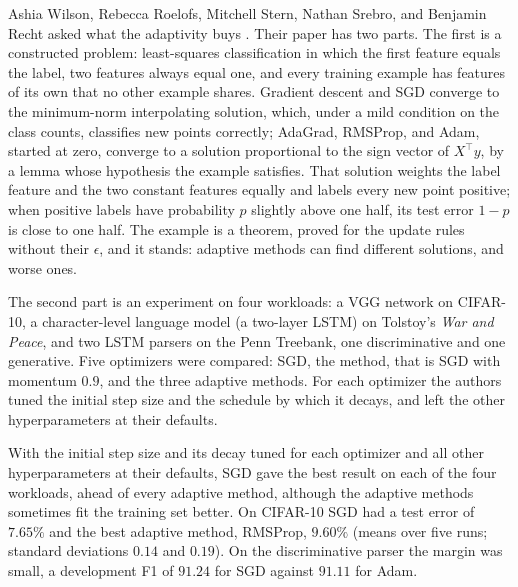 \begin{refsection}
Ashia Wilson, Rebecca Roelofs, Mitchell Stern, Nathan Srebro, and Benjamin Recht asked what the adaptivity buys \parencite{WilsonEtAl2017}. Their paper has two parts. The first is a constructed problem: least-squares classification in which the first feature equals the label, two features always equal one, and every training example has features of its own that no other example shares. Gradient descent and SGD converge to the minimum-norm interpolating solution, which, under a mild condition on the class counts, classifies new points correctly; AdaGrad, RMSProp, and Adam, started at zero, converge to a solution proportional to the sign vector of $X^\top y$, by a lemma whose hypothesis the example satisfies. That solution weights the label feature and the two constant features equally and labels every new point positive; when positive labels have probability $p$ slightly above one half, its test error $1-p$ is close to one half. The example is a theorem, proved for the update rules without their $\epsilon$, and it stands: adaptive methods can find different solutions, and worse ones.

The second part is an experiment on four workloads: a VGG network on CIFAR-10, a character-level language model (a two-layer LSTM) on Tolstoy's \emph{War and Peace}, and two LSTM parsers on the Penn Treebank, one discriminative and one generative. Five optimizers were compared: SGD, the  method, that is SGD with momentum $0.9$, and the three adaptive methods. For each optimizer the authors tuned the initial step size and the schedule by which it decays, and left the other hyperparameters at their defaults.

\begin{finding}\label{fd:budgets:wilson}
With the initial step size and its decay tuned for each optimizer and all other hyperparameters at their defaults, SGD gave the best result on each of the four workloads, ahead of every adaptive method, although the adaptive methods sometimes fit the training set better. On CIFAR-10 SGD had a test error of $7.65\%$ and the best adaptive method, RMSProp, $9.60\%$ (means over five runs; standard deviations $0.14$ and $0.19$). On the discriminative parser the margin was small, a development F1 of $91.24$ for SGD against $91.11$ for Adam.
\end{finding}


\end{refsection}
